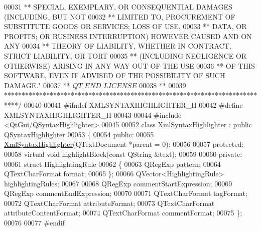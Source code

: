 \begin{DoxyCode}
00031 \textcolor{comment}{** SPECIAL, EXEMPLARY, OR CONSEQUENTIAL DAMAGES (INCLUDING, BUT NOT}
00032 \textcolor{comment}{** LIMITED TO, PROCUREMENT OF SUBSTITUTE GOODS OR SERVICES; LOSS OF USE,}
00033 \textcolor{comment}{** DATA, OR PROFITS; OR BUSINESS INTERRUPTION) HOWEVER CAUSED AND ON ANY}
00034 \textcolor{comment}{** THEORY OF LIABILITY, WHETHER IN CONTRACT, STRICT LIABILITY, OR TORT}
00035 \textcolor{comment}{** (INCLUDING NEGLIGENCE OR OTHERWISE) ARISING IN ANY WAY OUT OF THE USE}
00036 \textcolor{comment}{** OF THIS SOFTWARE, EVEN IF ADVISED OF THE POSSIBILITY OF SUCH DAMAGE."}
00037 \textcolor{comment}{** $QT\_END\_LICENSE$}
00038 \textcolor{comment}{**}
00039 \textcolor{comment}{****************************************************************************/}
00040 
00041 \textcolor{preprocessor}{#ifndef XMLSYNTAXHIGHLIGHTER\_H}
00042 \textcolor{preprocessor}{}\textcolor{preprocessor}{#define XMLSYNTAXHIGHLIGHTER\_H}
00043 \textcolor{preprocessor}{}
00044 \textcolor{preprocessor}{#include <QtGui/QSyntaxHighlighter>}
00045 
\hypertarget{xmlsyntaxhighlighter_8h_source_l00052}{}\hyperlink{class_xml_syntax_highlighter}{00052} \textcolor{keyword}{class }\hyperlink{class_xml_syntax_highlighter}{XmlSyntaxHighlighter} : \textcolor{keyword}{public} QSyntaxHighlighter
00053 \{
00054     \textcolor{keyword}{public}:
00055         \hyperlink{class_xml_syntax_highlighter}{XmlSyntaxHighlighter}(QTextDocument *parent = 0);
00056 
00057     \textcolor{keyword}{protected}:
00058         \textcolor{keyword}{virtual} \textcolor{keywordtype}{void} highlightBlock(\textcolor{keyword}{const} QString &text);
00059 
00060     \textcolor{keyword}{private}:
00061         \textcolor{keyword}{struct }HighlightingRule
00062         \{
00063             QRegExp pattern;
00064             QTextCharFormat format;
00065         \};
00066         QVector<HighlightingRule> highlightingRules;
00067 
00068         QRegExp commentStartExpression;
00069         QRegExp commentEndExpression;
00070 
00071         QTextCharFormat tagFormat;
00072         QTextCharFormat attributeFormat;
00073         QTextCharFormat attributeContentFormat;
00074         QTextCharFormat commentFormat;
00075 \};
00076 
00077 \textcolor{preprocessor}{#endif}
\end{DoxyCode}
